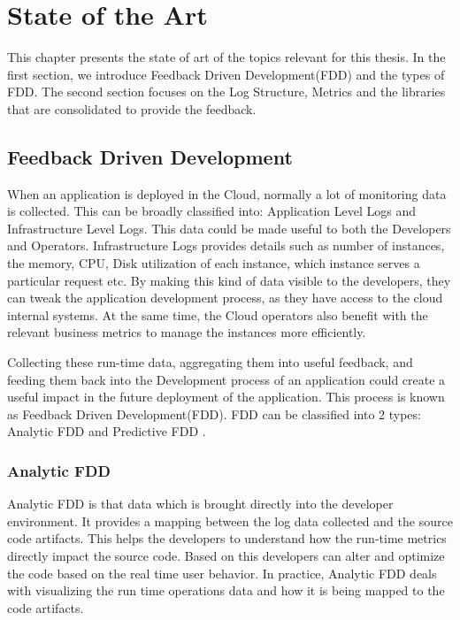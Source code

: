 \documentclass[article,type=msc,colorback,12pt,accentcolor=tud7b]{tudthesis}
\begin{document}

	\cleardoublepage

 \section{State of the Art}
 	
	This chapter presents the state of art of the topics relevant for this thesis. In the first section, we introduce Feedback Driven Development(FDD) and the types of FDD. The second section focuses on the Log Structure, Metrics and the libraries that are consolidated to provide the feedback.  
 	
	\subsection{Feedback Driven Development } 		
	
	When an application is deployed in the Cloud, normally a lot of monitoring data is collected. This can be broadly classified into: Application Level Logs and Infrastructure Level Logs. This data could be made useful to both the Developers and Operators. Infrastructure Logs provides details such as number of instances, the memory, CPU, Disk utilization of each instance, which instance serves a particular request etc. By making this kind of data visible to the developers, they can tweak the application development process, as they have access to the cloud internal systems. At the same time, the Cloud operators also benefit with the relevant business metrics to manage the instances more efficiently. 
	
	\par Collecting these run-time data, aggregating them into useful feedback, and feeding them back into the Development process of an application could create a useful impact in the future deployment of the application. This process is known as Feedback Driven Development(FDD). FDD can be classified into 2 types: Analytic FDD and Predictive FDD \cite{cito2015runtime}.
	
	\subsubsection{Analytic FDD}
		
	Analytic FDD is that data which is brought directly into the developer environment. It provides a mapping between the log data collected and the source code artifacts. This helps the developers to understand how the run-time metrics directly impact the source code. Based on this developers can alter and optimize the code based on the real time user behavior. In practice, Analytic FDD deals with visualizing the run time operations data and how it is being mapped to the code artifacts. 
		
\end{document}
